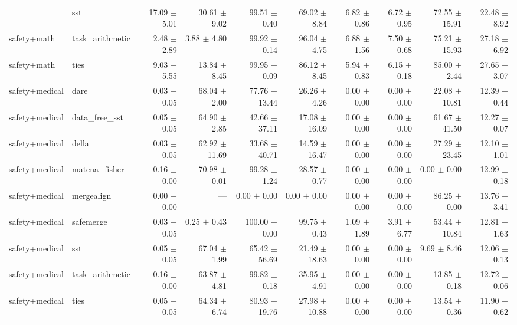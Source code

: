\begin{table}[H]
{\begin{tabular}{llrrrrrrrr}
{safety+math & sst & 17.09 $\pm$ 5.01 & 30.61 $\pm$ 9.02 & 99.51 $\pm$ 0.40 & 69.02 $\pm$ 8.84 & 6.82 $\pm$ 0.86 & 6.72 $\pm$ 0.95 & 72.55 $\pm$ 15.91 & 22.48 $\pm$ 8.92 \\
safety+math & task\_arithmetic & 2.48 $\pm$ 2.89 & 3.88 $\pm$ 4.80 & 99.92 $\pm$ 0.14 & 96.04 $\pm$ 4.75 & 6.88 $\pm$ 1.56 & 7.50 $\pm$ 0.68 & 75.21 $\pm$ 15.93 & 27.18 $\pm$ 6.92 \\
safety+math & ties & 9.03 $\pm$ 5.55 & 13.84 $\pm$ 8.45 & 99.95 $\pm$ 0.09 & 86.12 $\pm$ 8.45 & 5.94 $\pm$ 0.83 & 6.15 $\pm$ 0.18 & 85.00 $\pm$ 2.44 & 27.65 $\pm$ 3.07 \\
safety+medical & dare & 0.03 $\pm$ 0.05 & 68.04 $\pm$ 2.00 & 77.76 $\pm$ 13.44 & 26.26 $\pm$ 4.26 & 0.00 $\pm$ 0.00 & 0.00 $\pm$ 0.00 & 22.08 $\pm$ 10.81 & 12.39 $\pm$ 0.44 \\
safety+medical & data\_free\_sst & 0.05 $\pm$ 0.05 & 64.90 $\pm$ 2.85 & 42.66 $\pm$ 37.11 & 17.08 $\pm$ 16.09 & 0.00 $\pm$ 0.00 & 0.00 $\pm$ 0.00 & 61.67 $\pm$ 41.50 & 12.27 $\pm$ 0.07 \\
safety+medical & della & 0.03 $\pm$ 0.05 & 62.92 $\pm$ 11.69 & 33.68 $\pm$ 40.71 & 14.59 $\pm$ 16.47 & 0.00 $\pm$ 0.00 & 0.00 $\pm$ 0.00 & 27.29 $\pm$ 23.45 & 12.10 $\pm$ 1.01 \\
safety+medical & matena\_fisher & 0.16 $\pm$ 0.00 & 70.98 $\pm$ 0.01 & 99.28 $\pm$ 1.24 & 28.57 $\pm$ 0.77 & 0.00 $\pm$ 0.00 & 0.00 $\pm$ 0.00 & 0.00 $\pm$ 0.00 & 12.99 $\pm$ 0.18 \\
safety+medical & mergealign & 0.00 $\pm$ 0.00 & --- & 0.00 $\pm$ 0.00 & 0.00 $\pm$ 0.00 & 0.00 $\pm$ 0.00 & 0.00 $\pm$ 0.00 & 86.25 $\pm$ 0.00 & 13.76 $\pm$ 3.41 \\
safety+medical & safemerge & 0.03 $\pm$ 0.05 & 0.25 $\pm$ 0.43 & 100.00 $\pm$ 0.00 & 99.75 $\pm$ 0.43 & 1.09 $\pm$ 1.89 & 3.91 $\pm$ 6.77 & 53.44 $\pm$ 10.84 & 12.81 $\pm$ 1.63 \\
safety+medical & sst & 0.05 $\pm$ 0.05 & 67.04 $\pm$ 1.99 & 65.42 $\pm$ 56.69 & 21.49 $\pm$ 18.63 & 0.00 $\pm$ 0.00 & 0.00 $\pm$ 0.00 & 9.69 $\pm$ 8.46 & 12.06 $\pm$ 0.13 \\
safety+medical & task\_arithmetic & 0.16 $\pm$ 0.00 & 63.87 $\pm$ 4.81 & 99.82 $\pm$ 0.18 & 35.95 $\pm$ 4.91 & 0.00 $\pm$ 0.00 & 0.00 $\pm$ 0.00 & 13.85 $\pm$ 0.18 & 12.72 $\pm$ 0.06 \\
safety+medical & ties & 0.05 $\pm$ 0.05 & 64.34 $\pm$ 6.74 & 80.93 $\pm$ 19.76 & 27.98 $\pm$ 10.88 & 0.00 $\pm$ 0.00 & 0.00 $\pm$ 0.00 & 13.54 $\pm$ 0.36 & 11.90 $\pm$ 0.62 \\
\bottomrule
\end{tabular}
}
\end{table}


